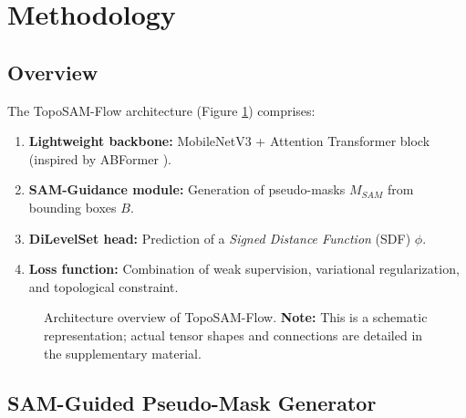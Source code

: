 \documentclass[12pt, a4paper]{article}
\begin{document}
\section{Methodology}
\label{sec:methodology}

\subsection{Overview}
\label{subsec:overview}

The TopoSAM-Flow architecture (Figure \ref{fig:architecture}) comprises:
\begin{enumerate}
    \item \textbf{Lightweight backbone:} MobileNetV3 + Attention Transformer block (inspired by ABFormer \cite{zheng2023abformer}).
    \item \textbf{SAM-Guidance module:} Generation of pseudo-masks $M_{SAM}$ from bounding boxes $B$.
    \item \textbf{DiLevelSet head:} Prediction of a \textit{Signed Distance Function} (SDF) $\phi$.
    \item \textbf{Loss function:} Combination of weak supervision, variational regularization, and topological constraint.
\end{enumerate}

\begin{figure}[h]
\centering
{}
\caption{Architecture overview of TopoSAM-Flow. \textbf{Note:} This is a schematic representation; actual tensor shapes and connections are detailed in the supplementary material.}
\label{fig:architecture}
\end{figure}

\subsection{SAM-Guided Pseudo-Mask Generator}
\label{subsec:sam_guidance}
\end{document}
